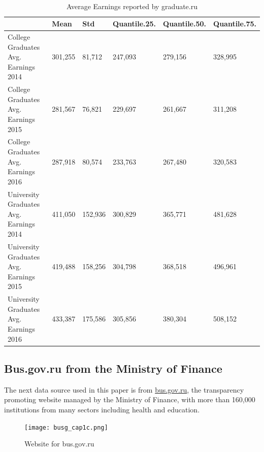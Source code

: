 \documentclass[alpha-refs]{wiley-article-05g}
\begin{document}
\begin{table}[htbp!]
    \centering
		\caption{Average Earnings reported by graduate.ru}
		\label{tab:1.1}\\
    \begin{tabular}{|l|l|l|l|l|l|}
    \hline
         & Mean & Std & Quantile.25. & Quantile.50. & Quantile.75. \\ \hline
        College Graduates Avg. Earnings 2014 & 301,255 & 81,712 & 247,093 & 279,156 & 328,995 \\ \hline
        College Graduates Avg. Earnings 2015 & 281,567 & 76,821 & 229,697 & 261,667 & 311,208 \\ \hline
        College Graduates Avg. Earnings 2016 & 287,918 & 80,574 & 233,763 & 267,480 & 320,583 \\ \hline
        University Graduates Avg. Earnings 2014 & 411,050 & 152,936 & 300,829 & 365,771 & 481,628 \\ \hline
        University Graduates Avg. Earnings 2015 & 419,488 & 158,256 & 304,798 & 368,518 & 496,961 \\ \hline
        University Graduates Avg. Earnings 2016 & 433,387 & 175,586 & 305,856 & 380,304 & 508,152 \\ \hline
    \end{tabular}
\end{table}

\vspace{-0.3in}

\subsection{Bus.gov.ru from the Ministry of Finance}

The next data source used in this paper is from \url{bus.gov.ru}, the transparency promoting website managed by the Ministry of Finance, with more than 160,000 institutions from many sectors including health and education. 

\vspace{-0.25in}

\begin{center}
	\begin{figure}[htbp!]
\begin{minipage}[b]{1\linewidth}
			\centering
			\hspace*{-0.1in}
         \texttt{[image: busg\_cap1c.png]}
		\end{minipage}
			\caption{Website for bus.gov.ru}\label{fig:1.2}
	\end{figure}
\end{center}
\end{document}
